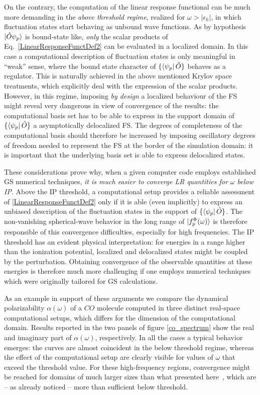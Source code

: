\documentclass[reprint,aps,prb]{revtex4-1}
\newcommand{\eps}{\epsilon}
\newcommand{\op}[1]{\hat {#1}}
\begin{document}
On the contrary, the computation of the linear response functional can be much more demanding in the \emph{above threshold regime}, realized for $\omega>|\eps_h|$, in which fluctuation
states start behaving as unbound wave functions.
As by hypothesis $\ket{\op O \psi_p}$ is bound-state like, \emph{only} the scalar products of Eq.~\eqref{LinearResponseFunctDef2} can be evaluated in a localized domain.
In this case a computational description of fluctuation states is only meaningful in ``weak'' sense, where the bound state character of $\{\bra{\psi_p}\op O\}$ behaves as a regulator. This is naturally achieved in the above mentioned Krylov space treatments, which explicitly deal with the expression of the scalar products. However, in this regime, imposing \emph{by design} a localized behaviour of the FS might reveal very dangerous in view of convergence of the results:
the computational basis set has to be able to express in the support domain of $\{\bra{\psi_p}\op O\}$ a asymptotically delocalized FS. The degrees of completeness of the computational basis should therefore be increased by imposing oscillatory degrees of freedom needed to represent the FS at the border of the simulation domain: it is important that the underlying basis set is able to express delocalized states.

These considerations prove why, when a given computer code employs established GS numerical techniques,
\emph{it is much easier to converge LR quantities for $\omega$ below IP}.
Above the IP threshold, a computational setup
provides a reliable assessment of \eqref{LinearResponseFunctDef2} only if it is able (even implicitly) to express an
unbiased description of the fluctuation states in the support of $\{\bra{\psi_p}\op O\}$.
The non-vanishing spherical-wave behavior in the long range of $\ket{f_p^\Phi(\omega)}$ is therefore responsible
of this convergence difficulties, especially for high frequencies.
The IP threshold has an evident physical interpretation: for energies in a range higher than the ionization potential,
localized and delocalized states might be coupled by the perturbation. Obtaining convergence of the observable quantities at these energies is therefore much more challenging if one employs
numerical techniques which were originally tailored for GS calculations.

As an example in support of these arguments we compare the {dynamical polarizability $\alpha(\omega)$} of a $CO$ molecule computed in three distinct real-space computational setups, which differs for the dimension of the computational domain.
Results reported in the two panels of figure \ref{co_spectrum} show the real and imaginary part of $\alpha(\omega)$, respectively. In all the cases a typical behavior emerges: the curves are almost coincident in the below threshold regime,
whereas the effect of the computational setup are clearly visible for values of  $\omega$ that exceed the threshold value.
For these high-frequency regions, convergence might be reached for domains of much larger sizes than what presented here~\cite{baroni2008},
which are -- as already noticed -- more than sufficient below threshold.
\end{document}
